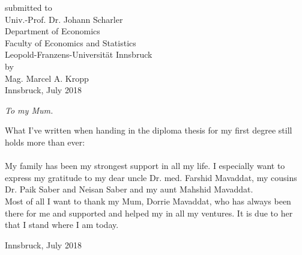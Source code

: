 \documentclass[a4paper,11pt,listof=nochaptergap,oneside,pointednumbers,bibtotoc,bigheadings,liststotoc]{scrbook}
\begin{document}
\begin{titlepage}
\begin{center}
        submitted to\\
        Univ.-Prof. Dr. Johann Scharler \\[10mm]
        Department of Economics\\
        Faculty of Economics and Statistics\\
        Leopold-Franzens-Universität Innsbruck \\[10mm]
        by \\ Mag. Marcel A. Kropp \\[10mm]
        Innsbruck, July 2018
    \end{center}
\end{titlepage}
\restoregeometry

\thispagestyle{empty} %
\null{}
    \begin{flushright}
       \large \textit{To my Mum.}\\
    \end{flushright}
\null


\newpage
\thispagestyle{empty} %


\vspace*{\fill}
What I've written when handing in the diploma thesis for my first degree still holds more than ever:\\
\\
My family has been my strongest support in all my life. I especially want to express my gratitude to my dear uncle Dr. med. Farshid Mavaddat, my cousins Dr. Paik Saber and Neisan Saber and my aunt Mahshid Mavaddat.\\
Most of all I want to thank my Mum, Dorrie Mavaddat, who has always been there for me and supported and helped my in all my ventures. It is due to her that I stand where I am today.
    \begin{flushright}
         Innsbruck, July 2018\\
    \end{flushright}
\vspace*{\fill}
%
\pagestyle{headings}
\end{document}
